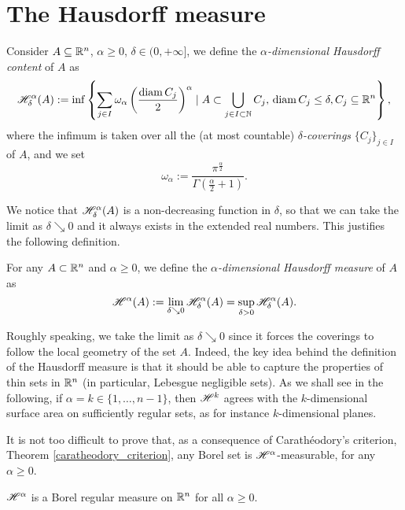 \section{The Hausdorff measure}

\begin{definition} Consider $A \subseteq \mathbb{R}^n$, $\alpha \geq 0$, $\delta \in (0,+\infty]$, we
define the \emph{$\alpha$-dimensional Hausdorff content} of $A$ as
\[
\mathscr{H}^{\alpha}_\delta(A) := \inf\left\{ \sum_{j\in I} \omega_\alpha
\left(\frac{\operatorname{diam} C_j}{2}\right)^\alpha \mid A \subset \bigcup_{j\in I \subset \mathbb{N}} C_j, \, \operatorname{diam}
C_j \leq \delta, C_j \subseteq \mathbb{R}^n \right\},
\]
where the infimum is taken over all the (at most countable) {\em $\delta$-coverings} $\{C_j\}_{j\in I}$ of $A$, and we set $$\omega_\alpha :=
\frac{\pi^{\frac{\alpha}{2}}}{\Gamma\left(\frac{\alpha}{2}+1\right)}.$$ 
\end{definition}

We notice that $\mathscr{H}^{\alpha}_\delta(A)$ is a non-decreasing function in $\delta$, so that we can take the limit as $\delta \searrow 0$ and it always exists in the extended real numbers. This justifies the following definition.

\begin{definition}
For any $A \subset \mathbb{R}^{n}$ and $\alpha \ge 0$, we define the \emph{$\alpha$-dimensional Hausdorff measure} of $A$ as 
\[
\mathscr{H}^{\alpha}(A) := \lim_{\delta \searrow 0} \mathscr{H}^{\alpha}_\delta (A) =
\sup_{\delta > 0} \mathscr{H}^{\alpha}_\delta(A).
\]
\end{definition}

Roughly speaking, we take the limit as $\delta \searrow 0$ since it forces the coverings to follow the local geometry of the set $A$. Indeed, the key idea behind the definition of the Hausdorff measure is that it should be able to capture the properties of thin sets in $\mathbb{R}^{n}$ (in particular, Lebesgue negligible sets). As we shall see in the following, if $\alpha = k \in \{ 1, \dots , n - 1\}$, then $\mathscr{H}^{k}$ agrees with the $k$-dimensional surface area on sufficiently regular sets, as for instance $k$-dimensional planes.

It is not too difficult to prove that, as a consequence of Carath\'eodory's criterion, Theorem \ref{caratheodory_criterion}, any Borel set is $\mathscr{H}^{\alpha}$-measurable, for any $\alpha \ge 0$.

\begin{theorem}
$\mathscr{H}^{\alpha}$ is a Borel regular measure on $\mathbb{R}^n$ for all $\alpha \geq
0$.
\end{theorem}

